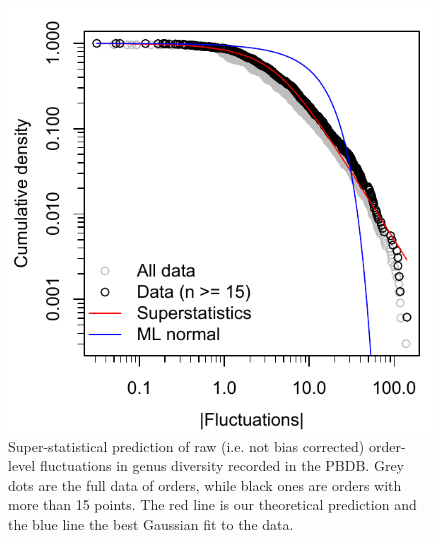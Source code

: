 \begin{figure}[!hp]
  \centering
  \includegraphics[scale=0.7]{figs/figSupp_pbdbRaw_Px.pdf}
  \caption[Super-statistical prediction of raw data]{Super-statistical
    prediction of raw (i.e. not bias corrected) order-level
    fluctuations in genus diversity recorded in the PBDB. Grey dots
    are the full data of orders, while black ones are orders with more
    than 15 points. The red line is our theoretical prediction and the
    blue line the best Gaussian fit to the data.}
  \label{fig:supp_rawPBDB_Px}
\end{figure}

